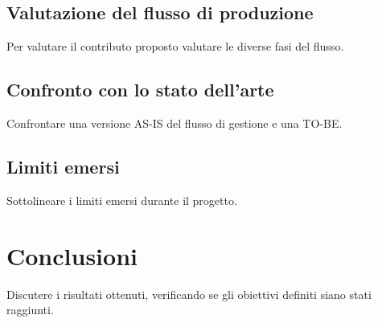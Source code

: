 \documentclass[a4paper,12pt]{article}
\begin{document}
\subsection*{Valutazione del flusso di produzione}
Per valutare il contributo proposto valutare le diverse fasi del flusso.

\subsection*{Confronto con lo stato dell’arte}
Confrontare una versione AS-IS del flusso di gestione e una TO-BE.

\subsection*{Limiti emersi}
Sottolineare i limiti emersi durante il progetto.

\section*{Conclusioni}
Discutere i risultati ottenuti, verificando se gli obiettivi definiti siano stati raggiunti.
\end{document}
